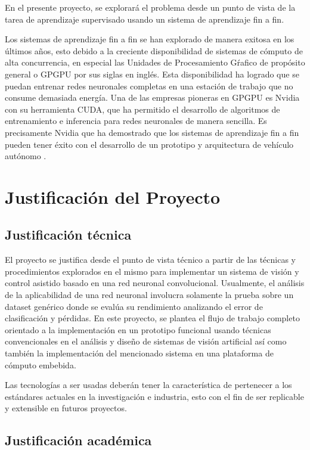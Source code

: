 \documentclass[12pt,letterpaper]{article}
\begin{document}
En el presente proyecto, se explorará el problema desde un punto de vista de la tarea de aprendizaje supervisado
usando un sistema de aprendizaje fin a fin.

Los sistemas de aprendizaje fin a fin se han explorado de manera exitosa en los últimos años, esto debido a la creciente
disponibilidad de sistemas de cómputo de alta concurrencia, en especial las Unidades de Procesamiento Gŕafico de propósito
general o GPGPU por sus siglas en inglés. Esta disponibilidad ha logrado que se puedan entrenar redes neuronales completas 
en una estación de trabajo que no consume demasiada energía. Una de las empresas pioneras en GPGPU es Nvidia con su herramienta 
CUDA, que ha permitido el desarrollo de algoritmos de entrenamiento e inferencia para redes neuronales de manera sencilla. Es 
precisamente Nvidia que ha demostrado que los sistemas de aprendizaje fin a fin pueden tener éxito con el desarrollo de un 
prototipo y arquitectura de vehículo autónomo \cite{bojarski2016end}.

\section{Justificación del Proyecto}

\subsection{Justificación técnica}

El proyecto se justifica desde el punto de vista técnico a partir de las técnicas y procedimientos explorados 
en el mismo para implementar un sistema de visión y control asistido basado en una red neuronal convolucional. 
Usualmente, el análisis de la aplicabilidad de una red neuronal involucra solamente la prueba sobre un dataset 
genérico donde se evalúa su rendimiento analizando el error de clasificación y pérdidas. En este proyecto, se plantea el 
flujo de trabajo completo orientado a la implementación en un prototipo funcional usando técnicas convencionales en 
el análisis y diseño de sistemas de visión artificial así como también la implementación del mencionado sistema en 
una plataforma de cómputo embebida.

Las tecnologías a ser usadas deberán tener la característica de pertenecer a los estándares actuales en la 
investigación e industria, esto con el fin de ser replicable y extensible en futuros proyectos.

\subsection{Justificación académica}
\end{document}
